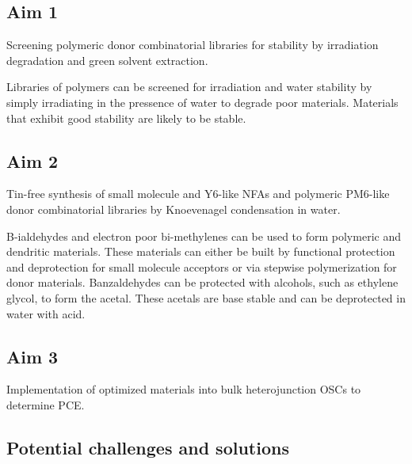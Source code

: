 \subsection{Aim 1}
Screening polymeric donor combinatorial libraries for stability by irradiation degradation and green solvent extraction.

Libraries of polymers can be screened for irradiation and water stability by simply irradiating in the pressence of water to degrade poor materials.
Materials that exhibit good stability are likely to be stable.

\subsection{Aim 2}
Tin-free synthesis of small molecule and Y6-like NFAs and polymeric PM6-like donor combinatorial libraries by Knoevenagel condensation in water.

B-ialdehydes and electron poor bi-methylenes can be used to form polymeric and dendritic materials.
These materials can either be built by functional protection and deprotection for small molecule acceptors or via stepwise polymerization for donor materials.
Banzaldehydes can be protected with alcohols, such as ethylene glycol, to form the acetal.
These acetals are base stable and can be deprotected in water with acid.

\subsection{Aim 3}
Implementation of optimized materials into bulk heterojunction OSCs to determine PCE.

\subsection{Potential challenges and solutions}
